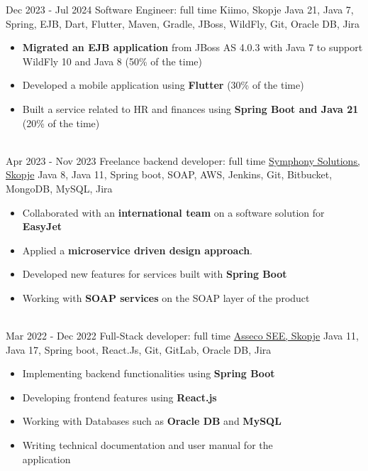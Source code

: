\documentclass[letterpaper]{twentysecondcv} %
\begin{document}
\begin{twenty} %
	\twentyitem
    		{Dec 2023 -}
            {Jul 2024}
        		{Software Engineer: full time}
        		{Kiimo, Skopje}
        		{Java 21, Java 7, Spring, EJB, Dart, Flutter, Maven, Gradle, JBoss, WildFly, Git, Oracle DB, Jira}
        		{\begin{itemize}
        			\item \textbf{Migrated an EJB application} from JBoss AS 4.0.3 with Java 7 to support WildFly 10 and Java 8 (50\% of the time)
                    \item Developed a mobile application using \textbf{Flutter} (30\% of the time)
        			\item Built a service related to HR and finances using \textbf{Spring Boot and Java 21} (20\% of the time)
                    
        		\end{itemize}}\\
     	\twentyitem
    		{Apr 2023 -}
		{Nov 2023}
        		{Freelance backend developer: full time}
        		{\href{https://symphony-solutions.com/}{Symphony Solutions, Skopje}}
        		{Java 8, Java 11, Spring boot, SOAP, AWS, Jenkins, Git, Bitbucket, MongoDB, MySQL, Jira}
        		{\begin{itemize}
        			\item Collaborated with an \textbf{international team} on a software solution for \textbf{EasyJet}
                    \item Applied a \textbf{microservice driven design approach}.
                    \item  Developed new features for services built with \textbf{Spring Boot}
        			\item Working with \textbf{SOAP services} on the SOAP layer of the product
        		\end{itemize}}\\
     	\twentyitem
    		{Mar 2022 -}
		{Dec 2022}
        		{Full-Stack developer: full time}
        		{\href{https://see.asseco.com/}{Asseco SEE, Skopje}}
        		{Java 11, Java 17, Spring boot, React.Js, Git, GitLab, Oracle DB, Jira}
        		{\begin{itemize}
        			\item Implementing backend functionalities using \textbf{Spring Boot}
        			\item Developing frontend features using \textbf{React.js}
        			\item Working with Databases such as \textbf{Oracle DB} and \textbf{MySQL}
        			\item Writing technical documentation and user manual for the\vspace{1mm}\\ application
        		\end{itemize}}\\
\end{twenty}
\end{document}
